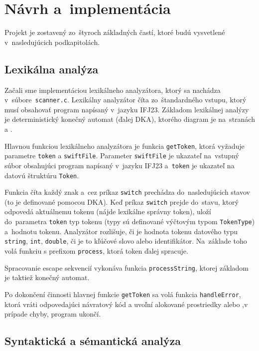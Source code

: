 \documentclass[a4paper, 11pt]{article}
\begin{document}

\section{Návrh a~implementácia}

Projekt je zostavený zo~štyroch základných častí, ktoré budú vysvetlené v~nasledujúcich
podkapitolách.

\subsection{Lexikálna analýza}
Začali sme implementáciou lexikálneho analyzátora, ktorý sa nachádza v~súbore~\texttt{scanner.c}.
Lexikálny analyzátor číta zo~štandardného vstupu, ktorý musí obsahovať program napísaný v~jazyku IFJ23. Základom lexikálnej analýzy je deterministický konečný automat (ďalej DKA), ktorého diagram je na~stranách \pageref{figure:DKA1} a \pageref{figure:DKA2}.

Hlavnou funkciou lexikálneho analyzátora je funkcia \texttt{getToken}, ktorá vyžaduje parametre \texttt{token} a \texttt{swiftFile}. Parameter \texttt{swiftFile} je ukazateľ na~vstupný súbor obsahujúci program napísaný v~jazyku IFJ23 a~\texttt{token} je ukazateľ na datovú štruktúru \texttt{Token}.

Funkcia číta každý znak a~cez príkaz \texttt{switch} prechádza do~nasledujúcich stavov (to je definované pomocou DKA). Keď príkaz \texttt{switch} prejde do~stavu, ktorý odpovedá aktuálnemu tokenu (nájde lexikálne správny token), uloží do~parametra \texttt{token} typ tokenu (typy sú definované výčtovým typom \texttt{TokenType}) a~hodnotu tokenu. Analyzátor rozlišuje, či je hodnota tokenu datového typu \texttt{string}, \texttt{int}, \texttt{double}, či je to kľúčové slovo alebo identifikátor. Na~základe toho volá funkciu s prefixom \texttt{process}, ktorá token ďalej spracuje.

Spracovanie escape sekvencií vykonáva funkcia \texttt{processString}, ktorej základom je taktiež konečný automat.

Po dokončení činnosti hlavnej funkcie \texttt{getToken} sa volá funkcia \texttt{handleError}, ktorá vráti odpovedajúci návratový kód a uvoľní alokované prostriedky alebo ,v prípade chyby, program ukončí.

\subsection{Syntaktická a sémantická analýza}
\label{subsec:parser}
\end{document}
